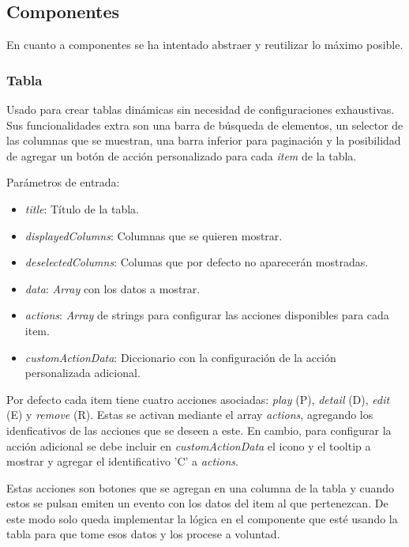 \subsection{Componentes}


En cuanto a componentes se ha intentado abstraer y reutilizar lo máximo posible.


\subsubsection{Tabla}


Usado para crear tablas dinámicas sin necesidad de configuraciones exhaustivas. Sus funcionalidades extra son una barra de búsqueda de elementos, un selector de las columnas que se muestran, una barra inferior para paginación y la posibilidad de agregar un botón de acción personalizado para cada \textit{item} de la tabla. 

\bigskip
Parámetros de entrada:
\begin{itemize}
	\item \textit{title}: Título de la tabla.
	\item \textit{displayedColumns}: Columnas que se quieren mostrar.
	\item \textit{deselectedColumns}: Columas que por defecto no aparecerán mostradas.
	\item \textit{data}: \textit{Array} con los datos a mostrar.
	\item \textit{actions}: \textit{Array} de strings para configurar las acciones disponibles para cada item.
	\item \textit{customActionData}: Diccionario con la configuración de la acción personalizada adicional.
\end{itemize}

Por defecto cada item tiene cuatro acciones asociadas: \textit{play} (P), \textit{detail} (D), \textit{edit} (E) y \textit{remove} (R). Estas se activan mediante el array \textit{actions}, agregando los idenficativos de las acciones que se deseen a este. En cambio, para configurar la acción adicional se debe incluir en \textit{customActionData} el icono y el tooltip a mostrar y agregar el identificativo 'C' a \textit{actions}.

Estas acciones son botones que se agregan en una columna de la tabla y cuando estos se pulsan emiten un evento con los datos del item al que pertenezcan. De este modo solo queda implementar la lógica en el componente que esté usando la tabla para que tome esos datos y los procese a voluntad.

